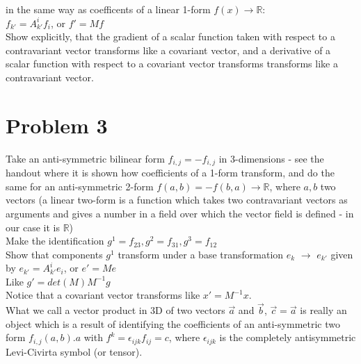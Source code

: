 \documentclass[11pt, letterpaper]{article}
\begin{document}
     in the same way as coefficents of a linear 1-form
     $f(x)\rightarrow\mathbb{R}$:\\

     \qquad $f_{k'}=A^i_{k'}f_i$, or $f'=Mf$\\

     Show explicitly, that the gradient of a scalar function taken with respect
     to a contravariant vector transforms like a covariant vector, and a
     derivative of a scalar function with respect to a covariant vector
     transforms transforms like a contravariant vector.\\

     \section*{Problem 3}
     Take an anti-symmetric bilinear form $f_{i,j}=-f_{i,j}$ in 3-dimensions -
     see the handout where it is shown how coefficients of a 1-form transform,
     and do the same for an anti-symmetric 2-form
     $f(a,b)=-f(b,a)\rightarrow\mathbb{R}$, where $a,b$ two vectors (a linear
     two-form is a function which takes two contravariant vectors as arguments
     and gives a number in a field over which the vector field is defined - in
     our case it is $\mathbb{R}$)\\

     Make the identification $g^1=f_{23}, g^2=f_{31}, g^3=f_{12}$\\

     Show that components $g^1$ transform under a base transformation {$e_k$}
     $\rightarrow$ {$e_{k'}$} given by $e_{k'}=A^i_{k'}e_i$, or $e'=Me$\\

     Like $g'=det(M)M^{-1}g$\\

     Notice that a covariant vector transforms like $x'=M^{-1}x$.\\

     What we call a vector product in 3D of two vectors $\vec a$ and $\vec b$,
     $\vec c = \vec a$ is really an object which is a result of identifying the
     coefficients of an anti-symmetric two form $f_{i,j}(a,b).a$ with
     $f^k=\epsilon_{ijk}f_{ij}=c$, where $\epsilon_{ijk}$ is the completely
     antisymmetric Levi-Civirta symbol (or tensor).
    
\end{document}
